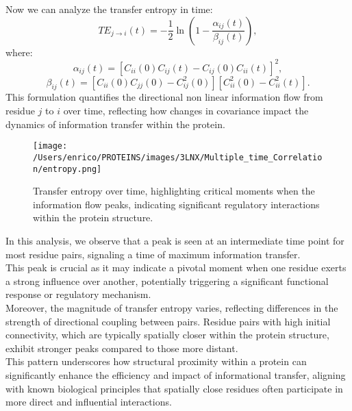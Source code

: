 \documentclass[English, Lau, oneside]{sapthesis}
\begin{document}
\newpage
Now we can analyze the transfer entropy in time:
\[
TE_{j \to i}(t) = -\frac{1}{2} \ln {(1 - \frac{\alpha_{ij}(t)}{\beta_{ij}(t)})},
\]
where:
\[
\alpha_{ij}(t) = \left[C_{ii}(0)C_{ij}(t) - C_{ij}(0)C_{ii}(t)\right]^2,
\]
\[
\beta_{ij}(t) = \left[C_{ii}(0)C_{jj}(0) - C_{ij}^2(0)\right]\left[C_{ii}^2(0) - C_{ii}^2(t)\right].
\]
This formulation quantifies the directional non linear information flow from residue \( j \) to \( i \) over time, reflecting how changes in covariance impact the dynamics of information transfer within the protein.
\begin{figure}[h!]
    \centering
    \texttt{[image: /Users/enrico/PROTEINS/images/3LNX/Multiple\_time\_Correlation/entropy.png]}
    \caption{Transfer entropy over time, highlighting critical moments when the information flow peaks, indicating significant regulatory interactions within the protein structure.}
\end{figure}
\newpage
In this analysis, we observe that a peak is seen at an intermediate time point for most residue pairs, signaling a time of maximum information transfer.\\
This peak is crucial as it may indicate a pivotal moment when one residue exerts a strong influence over another, potentially triggering a significant functional response or regulatory mechanism.\\
Moreover, the magnitude of transfer entropy varies, reflecting differences in the strength of directional coupling between pairs. Residue pairs with high initial connectivity, which are typically spatially closer within the protein structure, exhibit stronger peaks compared to those more distant.\\
This pattern underscores how structural proximity within a protein can significantly enhance the efficiency and impact of informational transfer, aligning with known biological principles that spatially close residues often participate in more direct and influential interactions.\\
\end{document}
